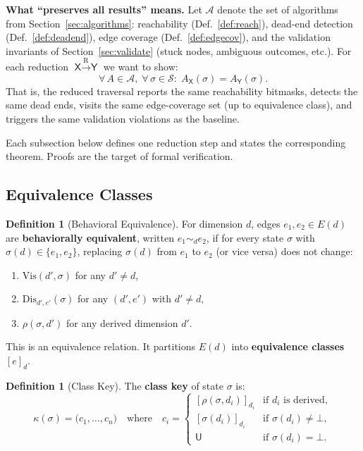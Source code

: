 \documentclass[11pt]{article}
\theoremstyle{definition}
\newtheorem{definition}[theorem]{Definition}
\newcommand{\St}{\mathcal{S}}          %
\newcommand{\Edg}[1]{E(#1)}            %
\newcommand{\sel}{\sigma}              %
\newcommand{\res}[2]{\rho(#1,#2)}      %
\newcommand{\ck}{\kappa}               %
\newcommand{\Vis}{\mathrm{Vis}}        %
\newcommand{\Dis}{\mathrm{Dis}}        %
\begin{document}
\medskip
\noindent
\textbf{What ``preserves all results'' means.}
Let $\mathcal{A}$ denote the set of algorithms from
Section~\ref{sec:algorithms}: reachability (Def.~\ref{def:reach}),
dead-end detection (Def.~\ref{def:deadend}), edge coverage
(Def.~\ref{def:edgecov}), and the validation invariants of
Section~\ref{sec:validate} (stuck nodes, ambiguous outcomes, etc.).
For each reduction $\textsf{X} \xrightarrow{\text{R}} \textsf{Y}$ we
want to show:
\[
  \forall\, A \in \mathcal{A},\;
  \forall\, \sel \in \St :\;
  A_{\textsf{X}}(\sel) = A_{\textsf{Y}}(\sel).
\]
That is, the reduced traversal reports the same reachability bitmasks,
detects the same dead ends, visits the same edge-coverage set (up to
equivalence class), and triggers the same validation violations as the
baseline.

\medskip
\noindent
Each subsection below defines one reduction step and states the
corresponding theorem. Proofs are the target of formal verification.

\subsection{Equivalence Classes}\label{sec:classes}

\begin{definition}[Behavioral Equivalence]\label{def:equiv}
For dimension $d$, edges $e_1, e_2 \in \Edg{d}$ are
\textbf{behaviorally equivalent}, written $e_1 \sim_d e_2$, if for every
state $\sel$ with $\sel(d) \in \{e_1, e_2\}$, replacing $\sel(d)$ from
$e_1$ to $e_2$ (or vice versa) does not change:
\begin{enumerate}[label=(\alph*)]
  \item $\Vis(d',\sel)$ for any $d' \neq d$,
  \item $\Dis_{d',e'}(\sel)$ for any $(d',e')$ with $d' \neq d$,
  \item $\res{\sel}{d'}$ for any derived dimension $d'$.
\end{enumerate}
\end{definition}

This is an equivalence relation. It partitions $\Edg{d}$ into
\textbf{equivalence classes} $[e]_d$.

\begin{definition}[Class Key]\label{def:classkey}
The \textbf{class key} of state $\sel$ is:
\[
  \ck(\sel) = \bigl(c_1,\dots,c_n\bigr)
  \quad\text{where}\quad
  c_i =
  \begin{cases}
    [\res{\sel}{d_i}]_{d_i}
      & \text{if } d_i \text{ is derived},\\
    [\sel(d_i)]_{d_i}
      & \text{if } \sel(d_i) \neq \bot,\\
    \mathsf{U}
      & \text{if } \sel(d_i) = \bot.
  \end{cases}
\]
\end{definition}
\end{document}
